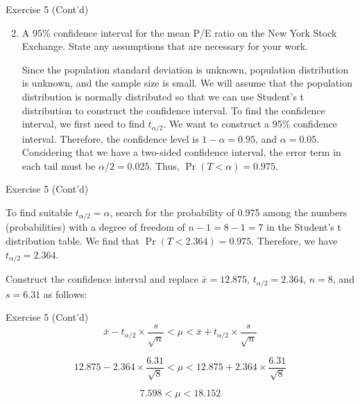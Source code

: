 \documentclass[
  ignorenonframetext,
  aspectratio=43,
]{beamer}
\let\olditem\item
\renewcommand\item{\olditem\justifying}
\begin{document}
\begin{frame}{Exercise 5 (Cont'd)}
\protect\hypertarget{exercise-5-contd}{}
\begin{enumerate}
\setcounter{enumi}{1}
\item
  A 95\% confidence interval for the mean P/E ratio on the New York
  Stock Exchange. State any assumptions that are necessary for your
  work.

  \pause

  Since the population standard deviation is unknown, population
  distribution is unknown, and the sample size is small. We will assume
  that the population distribution is normally distributed so that we
  can use Student's t distribution to construct the confidence interval.
  To find the confidence interval, we first need to find
  \(t_{\alpha/2}\). We want to construct a 95\% confidence interval.
  Therefore, the confidence level is \(1-\alpha = 0.95\), and
  \(\alpha = 0.05\). Considering that we have a two-sided confidence
  interval, the error term in each tail must be \(\alpha/2 = 0.025\).
  Thus, \(\Pr(T < \alpha) = 0.975\).
\end{enumerate}
\end{frame}

\begin{frame}{Exercise 5 (Cont'd)}
\protect\hypertarget{exercise-5-contd-1}{}
\pause

To find suitable \(t_{\alpha/2} = \alpha\), search for the probability
of 0.975 among the numbers (probabilities) with a degree of freedom of
\(n-1 = 8-1 = 7\) in the Student's t distribution table. We find that
\(\Pr(T < 2.364) = 0.975\). Therefore, we have \(t_{\alpha/2} = 2.364\).

\pause

Construct the confidence interval and replace \(\bar{x} = 12.875\),
\(t_{\alpha/2} = 2.364\), \(n = 8\), and \(s = 6.31\) as follows:
\end{frame}

\begin{frame}{Exercise 5 (Cont'd)}
\protect\hypertarget{exercise-5-contd-2}{}
\[
\bar{x} - t_{\alpha/2} \times \frac{s}{\sqrt{n}} < \mu < \bar{x} + t_{\alpha/2} \times \frac{s}{\sqrt{n}}
\]

\pause

\[
12.875 - 2.364 \times \frac{6.31}{\sqrt{8}} < \mu < 12.875 + 2.364 \times \frac{6.31}{\sqrt{8}}
\]

\pause

\[
7.598 < \mu < 18.152
\]
\end{frame}
\end{document}

